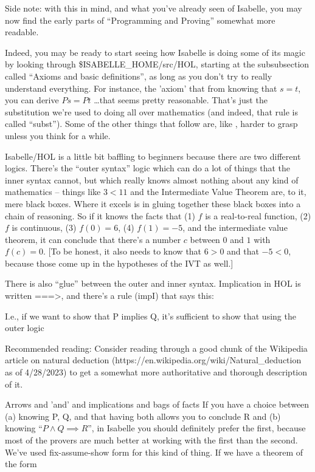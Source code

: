 Side note: with this in mind, and what you've already seen of Isabelle, you may now find the early parts of ``Programming and Proving'' somewhat more readable.

Indeed, you may be ready to start seeing how Isabelle is doing some of its magic by looking through \$ISABELLE\_HOME/src/HOL, starting at the subsubsection called ``Axioms and basic definitions'', as long as you don't try to really understand everything. For instance, the 'axiom' that from knowing that $s = t$, you can derive $P s = P t$ \ldots  that seems pretty reasonable. That's just the substitution we're used to doing all over mathematics (and indeed, that rule is called ``subst''). Some of the other things that follow are, like , harder to grasp unless you think for a while. 

Isabelle/HOL is a little bit baffling to beginners because there are two different logics. There's the ``outer syntax'' logic which can do a lot of things that the inner syntax cannot, but which really knows almost nothing about any kind of mathematics -- things like $3 < 11$ and the Intermediate Value Theorem are, to it, mere black boxes. Where it excels is in gluing together these black boxes into a chain of reasoning. So if it knows the facts that (1) $f$ is a real-to-real function, (2) $f$ is continuous, (3) $f(0) = 6$, (4) $f(1) = -5$, and the intermediate value theorem, it can conclude that there's a number $c$ between $0$ and $1$ with $f(c) = 0$. [To be honest, it also needs to know that $6 > 0$ and that $-5 < 0$, because those come up in the hypotheses of the IVT as well.] 

There is also ``glue'' between the outer and inner syntax. Implication in HOL is written ===>, and there's a rule (impI) that says this:

I.e., if we want to show that P implies Q, it's sufficient to show that using the outer logic

Recommended reading: Consider reading through a good chunk of the Wikipedia article on natural deduction (https://en.wikipedia.org/wiki/Natural\_deduction as of 4/28/2023) to get a somewhat more authoritative and thorough description of it. 

Arrows and 'and' and implications and bags of facts
If you have a choice between (a) knowing P, Q, and that having both allows you to conclude R and (b) knowing ``$P  \wedge  Q \implies R$'', in Isabelle you should definitely prefer the first, because most of the provers are much better at working with the first than the second. We've used fix-assume-show form for this kind of thing. If we have a theorem of the form

